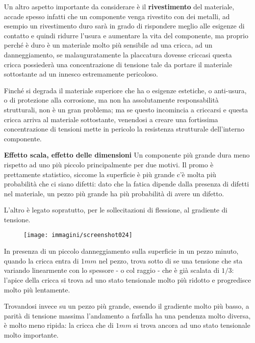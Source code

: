 \documentclass{article}
\begin{document}
\begin{adjustwidth}{2in}{}
			Un altro aspetto importante da considerare è il \textbf{rivestimento} del materiale, accade spesso infatti che un componente venga rivestito con dei metalli, ad esempio un rivestimento duro sarà in grado di rispondere meglio alle esigenze di contatto e quindi ridurre l'usura e aumentare la vita del componente, ma proprio perché è duro è un materiale molto più sensibile ad una cricca, ad un danneggiamento, se malauguratamente la placcatura dovesse criccasi questa cricca possiederà una concentrazione di tensione tale da portare il materiale sottostante ad un innesco estremamente pericoloso.
			
			 Finché si degrada il materiale superiore che ha o esigenze estetiche, o anti-usura, o di protezione alla corrosione, ma non ha assolutamente responsabilità strutturali, non è un gran problema; ma se questo incomincia a criccarsi e questa cricca arriva al materiale sottostante, venendosi a creare una fortissima concentrazione di tensioni mette in pericolo la resistenza strutturale dell'interno componente. \newline
			 
			 \textbf{\Large Effetto scala, effetto delle dimensioni} \newline
			 Un componente più grande dura meno rispetto ad uno più piccolo principalmente per due motivi. Il promo è prettamente statistico, siccome la superficie è più grande c'è molta più probabilità che ci siano difetti: dato che la fatica dipende dalla presenza di difetti nel materiale, un pezzo più grande ha più probabilità di avere un difetto.
			 
			 L'altro è legato sopratutto, per le sollecitazioni di flessione, al gradiente di tensione.
			 
			 \begin{figure}[H]
			 	\centering
			 	\texttt{[image: immagini/screenshot024]}
			 	\label{fig:screenshot024}
			 \end{figure}
			 
			 In presenza di un piccolo danneggiamento sulla superficie in un pezzo minuto, quando la cricca entra di $ 1mm $ nel pezzo, trova sotto di se una tensione che sta variando linearmente con lo spessore - o col raggio - che è già scalata di $1/3$: l'apice della cricca si trova ad uno stato tensionale molto più ridotto e progredisce molto più lentamente.
			 
			 Trovandosi invece su un pezzo più grande, essendo il gradiente molto più basso, a parità di tensione massima l'andamento a farfalla ha una pendenza molto diversa, è molto meno ripida: la cricca che di $ 1mm $ si trova ancora ad uno stato tensionale molto importante.
			 

\end{adjustwidth}
\end{document}
